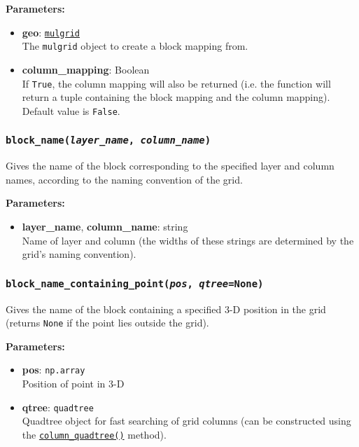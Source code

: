 \textbf{Parameters:}
\begin{itemize}
\item \textbf{geo}: \hyperref[mulgrids]{\texttt{mulgrid}}\\
  The \texttt{mulgrid} object to create a block mapping from.
\item \textbf{column\_mapping}: Boolean\\
  If \texttt{True}, the column mapping will also be returned (i.e. the function will return a tuple containing the block mapping and the column mapping).  Default value is \texttt{False}.
\end{itemize}

\begin{snugshade}\subsubsection{\texttt{block\_name(\emph{layer\_name}, \emph{column\_name})}}\end{snugshade}
\label{sec:mulgrid:block_name}

Gives the name of the block corresponding to the specified layer and column names, according to the naming convention of the grid.

\textbf{Parameters:}
\begin{itemize}
\item \textbf{layer\_name}, \textbf{column\_name}: string\\
  Name of layer and column (the widths of these strings are determined by the grid's naming convention).
\end{itemize}

\begin{snugshade}\subsubsection{\texttt{block\_name\_containing\_point(\emph{pos}, \emph{qtree}=None)}}\end{snugshade}
\label{sec:mulgrid:block_name_containing_point}

Gives the name of the block containing a specified 3-D position in the grid (returns \texttt{None} if the point lies outside the grid).

\textbf{Parameters:}
\begin{itemize}
\item \textbf{pos}: \texttt{np.array}\\
  Position of point in 3-D
\item \textbf{qtree}: \texttt{quadtree}\\
  Quadtree object for fast searching of grid columns (can be constructed using the \hyperref[sec:mulgrid:column_quadtree]{\texttt{column\_quadtree()}} method).
\end{itemize}

